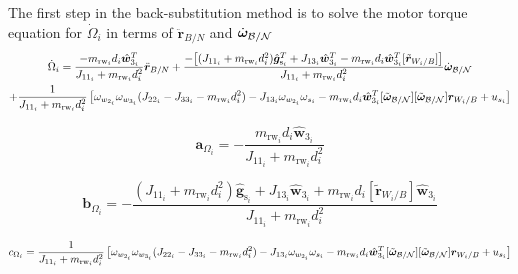 The first step in the back-substitution method is to solve the motor torque equation for $\dot{\Omega}_i$ in terms of $\ddot{\bm{r}}_{B/N}$ and $\dot{\bm\omega}_{\cal B/N}$
\begin{multline}
\dot{\Omega}_i
= \frac{-m_{\text{rw}_i} d_i \hat{\bm{w}}_{3_i}^T }{J_{11_i} + m_{\text{rw}_i} d_i^2}\ddot{\bm{r}}_{B/N} + \frac{-\big[(J_{11_i} + m_{\text{rw}_i} d_i^2)\hat{\bm g}_{\text{s}_i}^T  + J_{13_i}\hat{\bm w}_{3_i}^T -m_{\text{rw}_i} d_i \hat{\bm{w}}_{3_i}^T [\tilde{\bm r}_{W_i/B}]\big]}{J_{11_i} + m_{\text{rw}_i} d_i^2}\dot{\bm\omega}_{\cal B/N} 
\\
+\frac{1}{J_{11_i} + m_{\text{rw}_i} d_i^2}\left[\omega_{w_{2_i}} \omega_{w_{3_i}} (J_{22_i} - J_{33_i} - m_{\text{rw}_i} d_i^2
)-J_{13_i} \omega_{w_{2_i}}\omega_{s_i} -m_{\text{rw}_i} d_i \hat{\bm{w}}_{3_i}^T [\tilde{\bm\omega}_{\cal B/N}] [\tilde{\bm\omega}_{\cal B/N}] \bm r_{W_i/B} + u_{s_i} \right]
\label{eq:motorTorqueFinal2}
\end{multline}

\begin{equation}
\bm{a}_{\Omega_i} = -\frac{m_{\text{rw}_i} d_i \hat{\bm{w}}_{3_i} }{J_{11_i} + m_{\text{rw}_i} d_i^2}
\end{equation}

\begin{equation}
\bm{b}_{\Omega_i} = -\frac{(J_{11_i} + m_{\text{rw}_i} d_i^2)\hat{\bm g}_{\text{s}_i}  + J_{13_i}\hat{\bm w}_{3_i} +m_{\text{rw}_i} d_i  [\tilde{\bm r}_{W_i/B}]\hat{\bm{w}}_{3_i}}{J_{11_i} + m_{\text{rw}_i} d_i^2}
\end{equation}

\begin{equation}
c_{\Omega_i} = \frac{1}{J_{11_i} + m_{\text{rw}_i} d_i^2}\left[\omega_{w_{2_i}} \omega_{w_{3_i}} (J_{22_i} - J_{33_i} - m_{\text{rw}_i} d_i^2
) - J_{13_i} \omega_{w_{2_i}}\omega_{s_i} -m_{\text{rw}_i} d_i \hat{\bm{w}}_{3_i}^T [\tilde{\bm\omega}_{\cal B/N}] [\tilde{\bm\omega}_{\cal B/N}] \bm r_{W_i/B} + u_{s_i} \right]
\end{equation}



